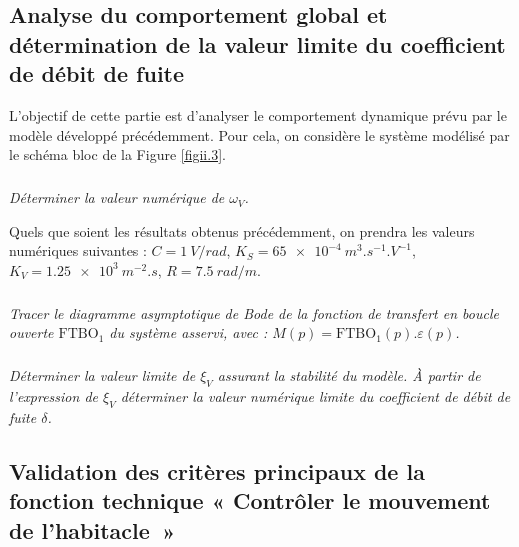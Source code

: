 \begin{multicols}{2}
\begin{multicols}{2}
\subsection*{Analyse du comportement global et détermination de la valeur limite du coefficient de débit de fuite}


L'objectif de cette partie est d'analyser le comportement dynamique prévu par le modèle développé précédemment. Pour cela, on considère le système modélisé par le schéma bloc de la Figure \ref{figii.3}.


\subparagraph{}\textit{Déterminer la valeur numérique de $\omega_V$.}
\ifprof
\begin{corrige}
\end{corrige}
\else
\fi


Quels que soient les résultats obtenus précédemment, on prendra les valeurs numériques suivantes :
$C = \SI{1}{V/rad}$, $K_S = \SI{65e-4}{m^3.s^{-1}.V^{-1}}$, $K_V = \SI{1,25e3}{m^{-2}.s}$, $R = \SI{7,5}{rad/m}$.

\subparagraph{}\textit{Tracer le diagramme asymptotique de Bode de la fonction de transfert en boucle ouverte $\text{FTBO}_1$ du système asservi, avec : $M(p)=\text{FTBO}_1(p).\varepsilon(p)$.}
\ifprof
\begin{corrige}
\end{corrige}
\else
\fi

\subparagraph{}\textit{Déterminer la valeur limite de $\xi_V$ assurant la stabilité du modèle. À partir de l'expression de $\xi_V$ déterminer la valeur numérique limite du coefficient de débit de fuite $\delta$.}
\ifprof
\begin{corrige}
\end{corrige}
\else
\fi

%


\subsection*{Validation des critères principaux de la fonction technique « Contrôler le mouvement de l'habitacle~»}




\end{multicols}
\end{multicols}
